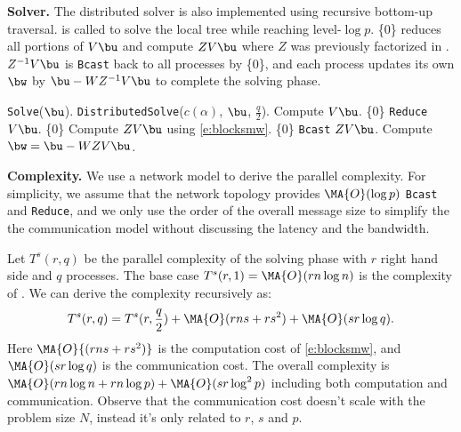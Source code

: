 {\bf Solver.}
The distributed solver is also implemented using recursive bottom-up
traversal.  is called to solve the local tree while 
reaching level-$\log{p}$.
\{0\} reduces all portions of $V\bu$ and compute $ZV\bu$
where $Z$ was previously factorized in .
$Z^{-1}V\bu$ is \texttt{Bcast} back to all processes by \{0\}, 
and each process updates its own$\bw$ 
by $\bu-WZ^{-1}V\bu$ to complete the solving phase.


\begin{algorithm}[!htp]
\begin{algorithmic}
    \STATE \texttt{Solve}($\bu$). \ELSE
    \STATE \texttt{DistributedSolve}($c(\alpha)$, $\bu$, $\frac{q}{2}$). \STATE Compute $V\bu$. \STATE \{0\} \texttt{Reduce} $V\bu$. \STATE \{0\}  Compute $ZV\bu$ using \eqref{e:blocksmw}. \STATE \{0\} \texttt{Bcast} $ZV\bu$. \STATE Compute $\bw=\bu-WZV\bu$. \ENDIF
\end{algorithmic}
\caption{{} $\bw=\texttt{DistributedSolve}(\alpha, \bu, q)$}
\label{a:distributedsolve}
\end{algorithm}

{\bf Complexity.}
We use a network model to derive the parallel complexity.
For simplicity, we assume that the network topology provides 
$\MA{O}(\log{p})$ \texttt{Bcast} and \texttt{Reduce}, and
we only use the order of the 
overall message size to simplify the the communication model
without discussing the latency and the bandwidth.

Let $T^{s}(r,q)$ be the parallel complexity of the solving phase 
with $r$ right hand side and $q$ processes. The base case 
$T^{s}(r,1)=\MA{O}(rn\log{n})$ is the complexity of .
We can derive the complexity recursively as:
\begin{equation}
  T^{s}(r,q) = T^{s}(r,\frac{q}{2}) + \MA{O}(rns+rs^2) + \MA{O}(sr\log{q}).
\end{equation}
Here $\MA{O}{(rns+rs^2)}$ is the computation cost of \eqref{e:blocksmw}, and
$\MA{O}(sr\log{q})$ is the communication cost.
The overall complexity is 
$\MA{O}(rn\log{n} + rn\log{p}) + \MA{O}(sr\log^{2}{p})$ including
both computation and communication.
Observe that the communication cost doesn't scale with the problem size
$N$, instead it's only related to $r$, $s$ and $p$.


